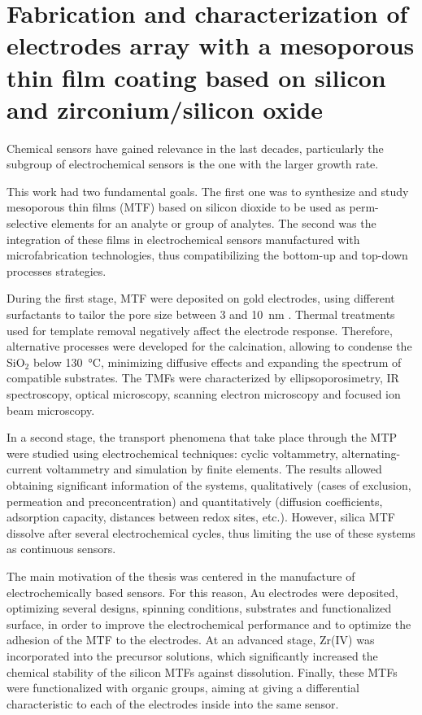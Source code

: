 \cleardoublepage

\mtcaddchapter[Abstract]
\section*{\centering\large{\bfseries{Fabrication and characterization of electrodes array with a mesoporous thin film coating based on silicon and zirconium/silicon oxide}}}

\vspace*{\fill}

Chemical sensors have gained relevance in the last decades, particularly the subgroup of electrochemical sensors is the one with the larger growth rate.

This work had two fundamental goals. The first one was to synthesize and study mesoporous thin films (MTF) based on silicon dioxide to be used as perm-selective elements for an analyte or group of analytes. The second was the integration of these films in electrochemical sensors manufactured with microfabrication technologies, thus compatibilizing the bottom-up and top-down processes strategies.

During the first stage, MTF were deposited on gold electrodes, using different surfactants to tailor the pore size between  3 and \SI{10}{\nm} . Thermal treatments used for template removal negatively affect the electrode response. Therefore, alternative processes were developed for the calcination, allowing to condense the SiO$_2$ below \SI{130}{\celsius}, minimizing diffusive effects and expanding the spectrum of compatible substrates. The TMFs were characterized by ellipsoporosimetry, IR spectroscopy, optical microscopy, scanning electron microscopy and focused ion beam microscopy.

In a second stage, the transport phenomena that take place through the MTP were studied using electrochemical techniques: cyclic voltammetry, alternating-current voltammetry and simulation by finite elements. The results allowed obtaining significant information of the systems, qualitatively (cases of exclusion, permeation and preconcentration) and quantitatively (diffusion coefficients, adsorption capacity, distances between redox sites, etc.). However, silica MTF dissolve after several electrochemical cycles, thus limiting the use of these systems as continuous sensors.

The main motivation of the thesis was centered in the manufacture of electrochemically based sensors. For this reason, Au electrodes were deposited, optimizing several designs, spinning conditions, substrates and functionalized surface, in order to improve the electrochemical performance and to optimize the adhesion of the MTF to the electrodes. At an advanced stage, Zr(IV) was incorporated into the precursor solutions, which significantly increased the chemical stability of the silicon MTFs against dissolution. Finally, these MTFs were functionalized with organic groups, aiming at giving a differential characteristic to each of the electrodes inside into the same sensor.

